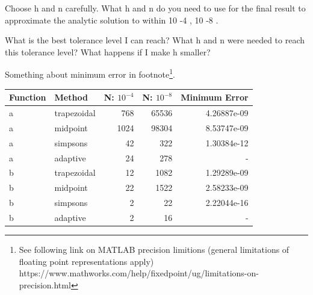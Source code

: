 \documentclass[a4paper]{article}
\begin{document}
Choose h and n carefully. What h and n do you need to use for the final result to approximate the analytic solution to within 10 -4 , 10 -8 .


What is the best tolerance level I can reach? What h and n were needed to reach this tolerance level? What happens if I make h smaller?


Something about minimum error in footnote\footnote{See following link on MATLAB precision limitions (general limitations of floating point representations apply) https://www.mathworks.com/help/fixedpoint/ug/limitations-on-precision.html}.


\bgroup
\def\arraystretch{1.5}
\begin{center}
	\centering
	\begin{tabular}{l|l|r|r|r}
	\textbf{Function} & \textbf{Method} & \textbf{N: $10^{-4}$} & \textbf{N: $10^{-8}$} &\textbf{Minimum Error} \\
	\hline  
	a & trapezoidal & 768  & 65536 & 4.26887e-09 \\
    a & midpoint    & 1024 & 98304 & 8.53747e-09 \\
    a & simpsons    & 42   & 322   & 1.30384e-12 \\
    a & adaptive    & 24   & 278   & -           \\
    b & trapezoidal & 12   & 1082  & 1.29289e-09 \\
    b & midpoint    & 22   & 1522  & 2.58233e-09 \\
    b & simpsons    & 2    & 22    & 2.22044e-16 \\
    b & adaptive    & 2    & 16    & -  
	\end{tabular}
	\label{table:results}
\end{center}
\egroup
\end{document}
